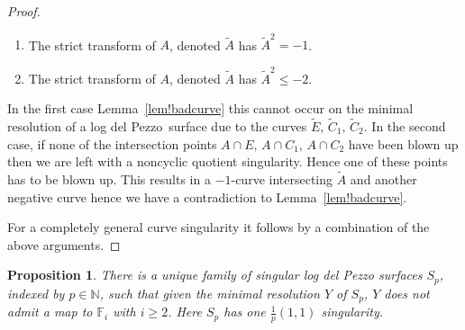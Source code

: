 \documentclass[11pt]{amsbook}
\theoremstyle{plain}
\newtheorem{prop}[thm]{Proposition}
\newcommand{\ldp}{log del Pezzo}
\newcommand{\mb}[1]{\mathbb{#1}}
\newcommand{\wt}[1]{\widetilde #1}
\begin{document}
\begin{proof}
\begin{enumerate}
\item
The strict transform of $A$, denoted $\widetilde{A}$ has $\wt{A}^2 = -1$.
\item
The strict transform of $A$, denoted $\widetilde{A}$ has $\wt{A}^2 \leq -2$.
\end{enumerate}

In the first case Lemma~\ref{lem!badcurve} this cannot occur on the minimal resolution of a \ldp\ surface due to the curves $\wt{E}, \, \wt{C_1},\, \wt{C_2}$. In the second case, if none of the intersection points $A\cap E, \, A \cap C_1, \, A \cap C_2$ have been blown up then we are left with a noncyclic quotient singularity. Hence one of these points has to be blown up. This results in a $-1$-curve intersecting $\wt{A}$ and another negative curve hence we have a contradiction to Lemma~\ref{lem!badcurve}.


For a completely general curve singularity it follows by a combination of the above arguments. 
\end{proof}


\begin{prop}\label{Surfaces to F_1}
There is a unique family of singular log del Pezzo surfaces $S_p$, indexed by $p \in \mb{N}$, such that given the minimal resolution $Y$ of $S_p$, $Y$ does not admit a map to $\mb{F}_i$ with $i \geq 2$. Here $S_p$ has one $\frac{1}{p}(1,1)$ singularity.
\end{prop}
\end{document}
